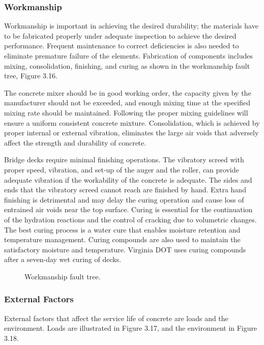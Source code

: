 \subsubsection{Workmanship}
Workmanship is important in achieving the desired durability; the materials have to be fabricated properly under
adequate inspection to achieve the desired performance. Frequent maintenance to correct deficiencies is also needed
to eliminate premature failure of the elements. Fabrication of components includes mixing, consolidation, finishing,
and curing as shown in the workmanship fault tree, Figure 3.16.

The concrete mixer should be in good working order, the capacity given by the manufacturer should not be
exceeded, and enough mixing time at the specified mixing rate should be maintained. Following the proper mixing
guidelines will ensure a uniform consistent concrete mixture. Consolidation, which is achieved by proper internal or
external vibration, eliminates the large air voids that adversely affect the strength and durability of concrete.

Bridge decks require minimal finishing operations. The vibratory screed with proper speed, vibration, and set-up
of the auger and the roller, can provide adequate vibration if the workability of the concrete is adequate. The sides
and ends that the vibratory screed cannot reach are finished by hand. Extra hand finishing is detrimental and may delay the curing operation and cause loss of entrained air voids near the top surface. Curing is essential for the
continuation of the hydration reactions and the control of cracking due to volumetric changes. The best curing
process is a water cure that enables moisture retention and temperature management. Curing compounds are also
used to maintain the satisfactory moisture and temperature. Virginia DOT uses curing compounds after a seven-day
wet curing of decks.

\begin{figure}
  \caption{Workmanship fault tree.}\label{fig:fault-tree-workmanship}
\end{figure}

\subsubsection{External Factors}
External factors that affect the service life of concrete are loads and the environment. Loads are illustrated in
Figure 3.17, and the environment in Figure 3.18.

